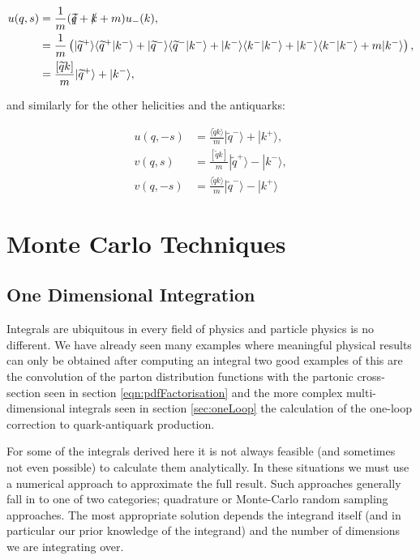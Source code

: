 	\begin{subequations}
	\begin{align*}
		u(q, s) &= \frac{1}{m}(\slashed{\widetilde{q}} + \slashed{k} + m)u_-(k), \\
		        &= \frac{1}{m}\left(|\widetilde{q}^+ \rangle\langle \widetilde{q}^+|k^-\rangle + |\widetilde{q}^- \rangle\langle \widetilde{q}^-|k^-\rangle + |k^- \rangle\langle k^-|k^-\rangle + |k^- \rangle\langle k^-|k^-\rangle + m|k^-\rangle\right), \\
		        &= \frac{[\widetilde{q}k]}{m}|\widetilde{q}^+\rangle + |k^-\rangle,
	\end{align*}
	\end{subequations}

	and similarly for the other helicities and the antiquarks:

	\begin{subequations}
	\begin{align}
		u(q, -s) &= \frac{\langle \widetilde{q}k\rangle}{m}|\widetilde{q}^-\rangle + |k^+\rangle, \\
		v(q,  s) &= \frac{[\widetilde{q}k]}{m}|\widetilde{q}^+\rangle - |k^-\rangle, \\
		v(q, -s) &= \frac{\langle \widetilde{q}k\rangle}{m}|\widetilde{q}^-\rangle - |k^+\rangle
	\end{align}
	\end{subequations}

\section{Monte Carlo Techniques}
\label{sec:MC}

\subsection{One Dimensional Integration}
\label{sub:MCOneD}

	Integrals are ubiquitous in every field of physics and particle physics is no different.  We have already seen many examples where meaningful physical results
	can only be obtained after computing an integral two good examples of this are the convolution of the parton distribution functions with the partonic
	cross-section seen in section \ref{eqn:pdfFactorisation} and the more complex multi-dimensional integrals seen in section \ref{sec:oneLoop} the calculation
	of the one-loop correction to quark-antiquark production.

	For some of the integrals derived here it is not always feasible (and sometimes not even possible) to calculate them analytically.  In these situations
	we must use a numerical approach to approximate the full result.  Such approaches generally fall in to one of two categories; quadrature
	or Monte-Carlo random sampling approaches.  The most appropriate solution depends the integrand itself (and in particular our prior knowledge of
	the integrand) and the number of dimensions we are integrating over.

